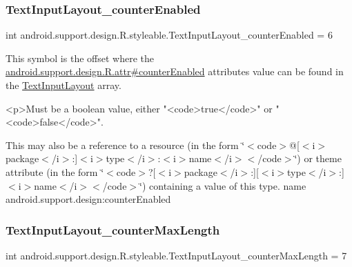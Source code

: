 \subsubsection{\texorpdfstring{Text\+Input\+Layout\+\_\+counter\+Enabled}{TextInputLayout\_counterEnabled}}
{\footnotesize\ttfamily int android.\+support.\+design.\+R.\+styleable.\+Text\+Input\+Layout\+\_\+counter\+Enabled = 6\hspace{0.3cm}{\ttfamily [static]}}

This symbol is the offset where the \hyperlink{classandroid_1_1support_1_1design_1_1R_1_1attr_a77bf5ed2837ea33d879fd47228e8cd09}{android.\+support.\+design.\+R.\+attr\#counter\+Enabled} attribute\textquotesingle{}s value can be found in the \hyperlink{classandroid_1_1support_1_1design_1_1R_1_1styleable_ae01fd2fce65dc8639f3898586b0cedcf}{Text\+Input\+Layout} array.

\begin{DoxyVerb}      <p>Must be a boolean value, either "<code>true</code>" or "<code>false</code>".
\end{DoxyVerb}
 

This may also be a reference to a resource (in the form \char`\"{}$<$code$>$@\mbox{[}$<$i$>$package$<$/i$>$\+:\mbox{]}$<$i$>$type$<$/i$>$\+:$<$i$>$name$<$/i$>$$<$/code$>$\char`\"{}) or theme attribute (in the form \char`\"{}$<$code$>$?\mbox{[}$<$i$>$package$<$/i$>$\+:\mbox{]}\mbox{[}$<$i$>$type$<$/i$>$\+:\mbox{]}$<$i$>$name$<$/i$>$$<$/code$>$\char`\"{}) containing a value of this type.  name android.\+support.\+design\+:counter\+Enabled \mbox{\label{classandroid_1_1support_1_1design_1_1R_1_1styleable_afce3e6248022ba8506318e081a5e6efb}} 
\subsubsection{\texorpdfstring{Text\+Input\+Layout\+\_\+counter\+Max\+Length}{TextInputLayout\_counterMaxLength}}
{\footnotesize\ttfamily int android.\+support.\+design.\+R.\+styleable.\+Text\+Input\+Layout\+\_\+counter\+Max\+Length = 7\hspace{0.3cm}{\ttfamily [static]}}

